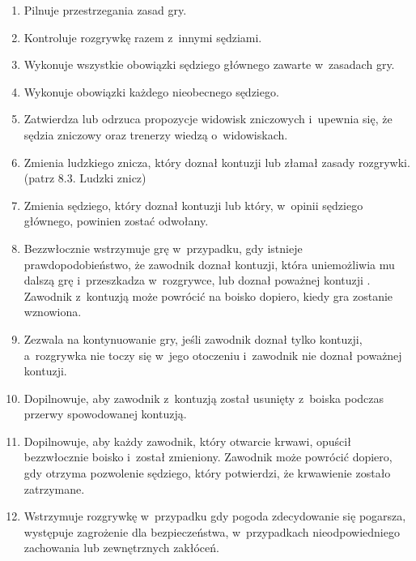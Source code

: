\documentclass[12pt]{article}
\begin{document}
\begin{enumerate}
	\item Pilnuje przestrzegania zasad gry.

	\item Kontroluje rozgrywkę razem z~innymi sędziami.

	\item Wykonuje wszystkie obowiązki sędziego głównego zawarte w~zasadach
	      gry.

	\item Wykonuje obowiązki każdego nieobecnego sędziego.

	\item Zatwierdza lub odrzuca propozycje widowisk zniczowych i~upewnia się,
	      że sędzia zniczowy oraz trenerzy wiedzą o~widowiskach.

	\item Zmienia ludzkiego znicza, który doznał kontuzji lub złamał zasady
	      rozgrywki. (patrz 8.3. Ludzki znicz)

	\item Zmienia sędziego, który doznał kontuzji lub który, w~opinii sędziego
	      głównego, powinien zostać odwołany.

	\item Bezzwłocznie wstrzymuje grę w~przypadku, gdy istnieje
	      prawdopodobieństwo, że zawodnik doznał kontuzji, która uniemożliwia mu
	      dalszą grę i~przeszkadza w~rozgrywce, lub doznał poważnej kontuzji .
	      Zawodnik z~kontuzją może powrócić na boisko dopiero, kiedy gra zostanie
	      wznowiona.

	\item Zezwala na kontynuowanie gry, jeśli zawodnik doznał tylko kontuzji, a~rozgrywka nie toczy się w~jego otoczeniu i~zawodnik nie doznał poważnej
	      kontuzji.

	\item Dopilnowuje, aby zawodnik z~kontuzją został usunięty z~boiska podczas
	      przerwy spowodowanej kontuzją.

	\item Dopilnowuje, aby każdy zawodnik, który otwarcie krwawi, opuścił
	      bezzwłocznie boisko i~został zmieniony. Zawodnik może powrócić dopiero,
	      gdy otrzyma pozwolenie sędziego, który potwierdzi, że krwawienie zostało
	      zatrzymane.

	\item Wstrzymuje rozgrywkę w~przypadku gdy pogoda zdecydowanie się
	      pogarsza, występuje zagrożenie dla bezpieczeństwa, w~przypadkach
	      nieodpowiedniego zachowania lub zewnętrznych zakłóceń.


\end{enumerate}
\end{document}
